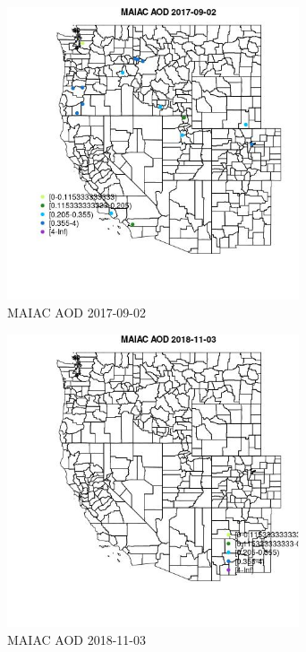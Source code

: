 \begin{figure} 
\centering  
\includegraphics[width=0.77\textwidth]{Code_Outputs/Report_ML_input_PM25_Step4_part_e_de_duplicated_aveswNAs_MapObsMAIAC_AOD2017-09-02.jpg} 
\caption{\label{fig:Report_ML_input_PM25_Step4_part_e_de_duplicated_aveswNAsMapObsMAIAC_AOD2017-09-02}MAIAC AOD 2017-09-02} 
\end{figure} 
 

\begin{figure} 
\centering  
\includegraphics[width=0.77\textwidth]{Code_Outputs/Report_ML_input_PM25_Step4_part_e_de_duplicated_aveswNAs_MapObsMAIAC_AOD2018-11-03.jpg} 
\caption{\label{fig:Report_ML_input_PM25_Step4_part_e_de_duplicated_aveswNAsMapObsMAIAC_AOD2018-11-03}MAIAC AOD 2018-11-03} 
\end{figure} 
 

